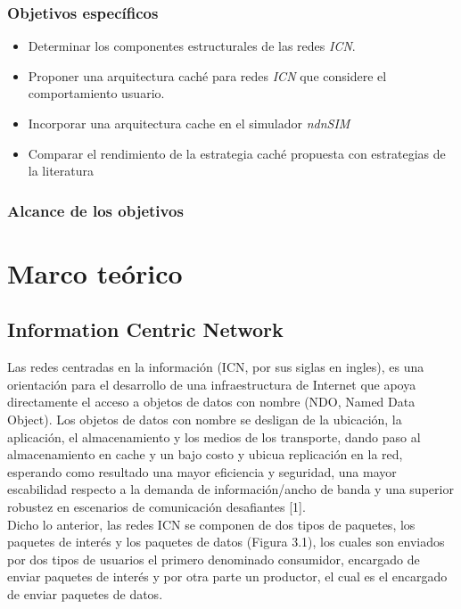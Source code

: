 \documentclass[12pt]{ociamthesis}  %
\begin{document}
\subsection{Objetivos específicos}
\begin{itemize}
	\item Determinar los componentes estructurales de las redes \textit{ICN}.
	\item Proponer una arquitectura caché para redes \textit{ICN} que considere el comportamiento usuario.
	\item Incorporar una arquitectura cache en el simulador \textit{ndnSIM}
	\item Comparar el rendimiento de la estrategia caché propuesta con estrategias de la literatura
\end{itemize}

\subsection{Alcance de los objetivos}

\chapter{Marco teórico}
\section{Information Centric Network}
Las redes centradas en la información (ICN, por sus siglas en ingles), es una orientación para el desarrollo de una infraestructura de Internet que apoya directamente el acceso a objetos de datos con nombre (NDO, Named Data Object). Los objetos de datos con nombre se desligan de la ubicación, la aplicación, el almacenamiento y los medios de los transporte, dando paso al almacenamiento en cache y un bajo costo y ubicua replicación en la red, esperando como resultado una mayor eficiencia y seguridad, una mayor escabilidad respecto a la demanda de información/ancho de banda y una superior robustez en escenarios de comunicación desafiantes [1].\\

Dicho lo anterior, las redes ICN se componen de dos tipos de paquetes, los paquetes de interés y los paquetes de datos (Figura 3.1), los cuales son enviados por dos tipos de usuarios el primero denominado consumidor, encargado de enviar paquetes de interés y por otra parte un productor, el cual es el encargado de enviar paquetes de datos.\\
\end{document}
